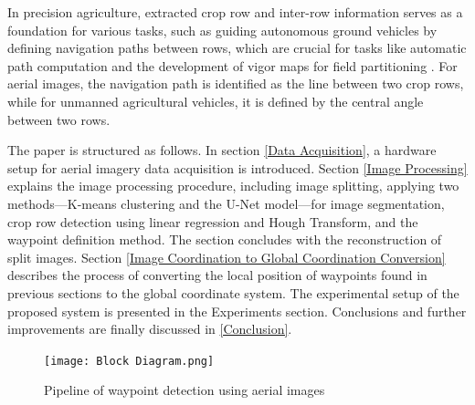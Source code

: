 \documentclass[conference]{IEEEtran}
\begin{document}
In precision agriculture, extracted crop row and inter-row information serves as a foundation for various tasks, such as guiding autonomous ground vehicles by defining navigation paths between rows, which are crucial for tasks like automatic path computation and the development of vigor maps for field partitioning \cite{b11}. For aerial images, the navigation path is identified as the line between two crop rows, while for unmanned agricultural vehicles, it is defined by the central angle between two rows\cite{b1}.

The paper is structured as follows. In section \ref{Data Acquisition}, a hardware setup for aerial imagery data acquisition is introduced. Section \ref{Image Processing} explains the image processing procedure, including image splitting, applying two methods—K-means clustering and the U-Net model—for image segmentation, crop row detection using linear regression and Hough Transform, and the waypoint definition method. The section concludes with the reconstruction of split images. Section \ref{Image Coordination to Global Coordination Conversion} describes the process of converting the local position of waypoints found in previous sections to the global coordinate system. The experimental setup of the proposed system is presented in the Experiments section. Conclusions and further improvements are finally discussed in 
\ref{Conclusion}.




\begin{figure}[htbp]
\texttt{[image: Block Diagram.png]}
\caption{Pipeline of waypoint detection using aerial images}
\label{fig1}
\end{figure}
\end{document}
